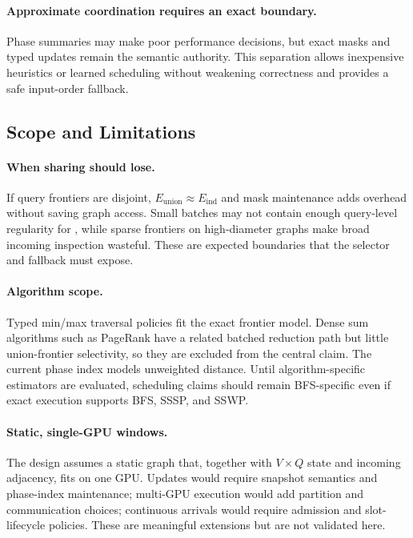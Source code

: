 \paragraph{Approximate coordination requires an exact boundary.}
Phase summaries may make poor performance decisions, but exact masks and typed updates remain the semantic authority.  This separation allows inexpensive heuristics or learned scheduling without weakening correctness and provides a safe input-order fallback.

\subsection{Scope and Limitations}

\paragraph{When sharing should lose.}
If query frontiers are disjoint, $E_{\mathrm{union}}\approx E_{\mathrm{ind}}$ and mask maintenance adds overhead without saving graph access.  Small batches may not contain enough query-level regularity for \coalescedgather, while sparse frontiers on high-diameter graphs make broad incoming inspection wasteful.  These are expected boundaries that the selector and fallback must expose.

\paragraph{Algorithm scope.}
Typed min/max traversal policies fit the exact frontier model.  Dense sum algorithms such as PageRank have a related batched reduction path but little union-frontier selectivity, so they are excluded from the central claim.  The current phase index models unweighted distance.  Until algorithm-specific estimators are evaluated, scheduling claims should remain BFS-specific even if exact execution supports BFS, SSSP, and SSWP.

\paragraph{Static, single-GPU windows.}
The design assumes a static graph that, together with $V\!\times\!Q$ state and incoming adjacency, fits on one GPU.  Updates would require snapshot semantics and phase-index maintenance; multi-GPU execution would add partition and communication choices; continuous arrivals would require admission and slot-lifecycle policies.  These are meaningful extensions but are not validated here.

